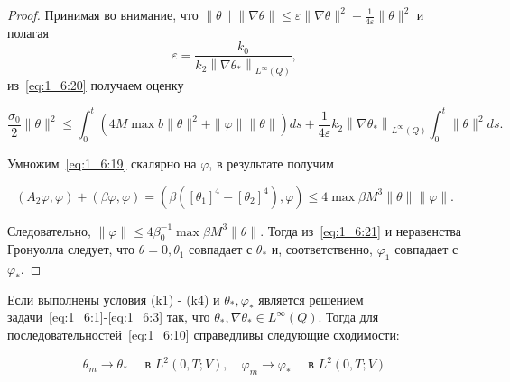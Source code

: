 \begin{proof}
    Принимая во внимание,
    что $\|\theta\|\|\nabla \theta\| \leq \varepsilon\|\nabla \theta\|^{2}
    +\frac{1}{4 \varepsilon}\|\theta\|^{2}$ и полагая
    \[
        \varepsilon=\frac{k_{0}}{k_{2}\left\|\nabla \theta_{*}\right\|_{L^{\infty}(Q)}},
    \]
    из~\eqref{eq:1_6:20} получаем оценку

    \begin{equation}
        \label{eq:1_6:21}
        \frac{\sigma_{0}}{2}\|\theta\|^{2} \leq \int_{0}^{t}\left(4 M \max b\|\theta\|^{2}
        +\|\varphi\|\|\theta\|\right) d s
        +\frac{1}{4 \varepsilon} k_{2}\left\|\nabla
        \theta_{*}\right\|_{L^{\infty}(Q)} \int_{0}^{t}\|\theta\|^{2} d s.
    \end{equation}

    Умножим~\eqref{eq:1_6:19} скалярно на $\varphi$, в результате получим

    \[
        \left(A_{2} \varphi, \varphi\right)+(\beta \varphi, \varphi)
        =\left(\beta\left(\left[\theta_{1}\right]^{4}
        -\left[\theta_{2}\right]^{4}\right), \varphi\right)
        \leq 4 \max \beta M^{3}\|\theta\|\|\varphi\|.
    \]


    Следовательно, $\|\varphi\| \leq 4 \beta_{0}^{-1} \max \beta M^{3}\|\theta\|$.
    Тогда из~\eqref{eq:1_6:21} и неравенства Гронуолла следует,
    что $\theta=0, \theta_{1}$ совпадает с $\theta_{*}$ и,
    соответственно, $\varphi_{1}$ совпадает с $\varphi_{*}$.
\end{proof}

\begin{theorem}
    \label{th:1_6:3}
    Если выполнены условия (k1) - (k4) и $\theta_{*}, \varphi_{*}$ является
    решением задачи~\eqref{eq:1_6:1}-\eqref{eq:1_6:3}
    так, что $\theta_{*}, \nabla \theta_{*} \in L^{\infty}(Q)$.
    Тогда для последовательностей~\eqref{eq:1_6:10} справедливы следующие сходимости:

    \[
        \theta_{m} \rightarrow \theta_{*} \quad \text { в } L^{2}(0, T ; V),
        \quad \varphi_{m} \rightarrow \varphi_{*} \quad \text { в } L^{2}(0, T ; V)
    \]
\end{theorem}


